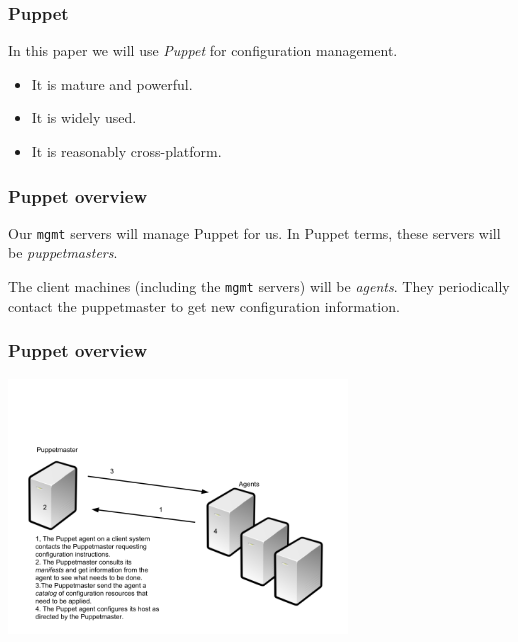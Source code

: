\documentclass[10pt]{beamer}
\begin{document}
\begin{frame}
  \frametitle{Puppet}

  In this paper we will use \emph{Puppet} for configuration management.
  
  \begin{itemize}
  \item It is mature and powerful.
  \item It is widely used.
  \item It is reasonably cross-platform.
  \end{itemize}

\end{frame}

\begin{frame}
  \frametitle{Puppet overview}

  Our \texttt{mgmt} servers will manage Puppet for us.  In Puppet terms, these servers will be \emph{puppetmasters}.
  
  The client machines (including the \texttt{mgmt} servers) will be \emph{agents}.  They periodically contact the puppetmaster to get new configuration information.
  
\end{frame}
\begin{frame}[fragile]
  \frametitle{Puppet overview}

  \includegraphics[width=90mm]{puppet.png} 
   
\end{frame}
\end{document}
